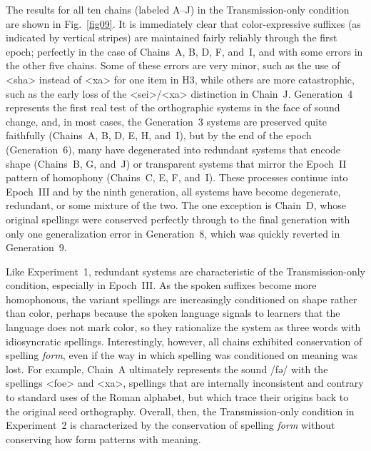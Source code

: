 \documentclass[doc,biblatex]{apa7}
\begin{document}
The results for all ten chains (labeled A--J) in the Transmission-only condition are shown in Fig.~\ref{fig09}. It is immediately clear that color-expressive suffixes (as indicated by vertical stripes) are maintained fairly reliably through the first epoch; perfectly in the case of Chains~A, B, D, F, and~I, and with some errors in the other five chains. Some of these errors are very minor, such as the use of <sha> instead of <xa> for one item in H3, while others are more catastrophic, such as the early loss of the <sei>/<xa> distinction in Chain~J. Generation~4 represents the first real test of the orthographic systems in the face of sound change, and, in most cases, the Generation~3 systems are preserved quite faithfully (Chains~A, B, D, E, H, and~I), but by the end of the epoch (Generation~6), many have degenerated into redundant systems that encode shape (Chains~B, G, and~J) or transparent systems that mirror the Epoch~II pattern of homophony (Chains~C, E, F, and~I). These processes continue into Epoch~III and by the ninth generation, all systems have become degenerate, redundant, or some mixture of the two. The one exception is Chain~D, whose original spellings were conserved perfectly through to the final generation with only one generalization error in Generation~8, which was quickly reverted in Generation~9.

Like Experiment~1, redundant systems are characteristic of the Transmission-only condition, especially in Epoch~III. As the spoken suffixes become more homophonous, the variant spellings are increasingly conditioned on shape rather than color, perhaps because the spoken language signals to learners that the language does not mark color, so they rationalize the system as three words with idiosyncratic spellings. Interestingly, however, all chains exhibited conservation of spelling \textit{form}, even if the way in which spelling was conditioned on meaning was lost. For example, Chain~A ultimately represents the sound /fə/ with the spellings <foe> and <xa>, spellings that are internally inconsistent and contrary to standard uses of the Roman alphabet, but which trace their origins back to the original seed orthography. Overall, then, the Transmission-only condition in Experiment~2 is characterized by the conservation of spelling \textit{form} without conserving how form patterns with meaning.
\end{document}

